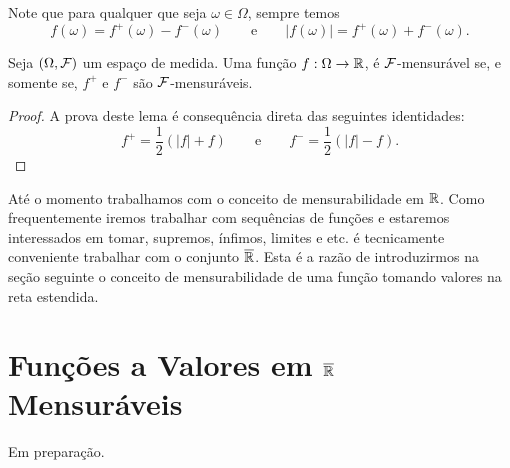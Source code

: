 Note que para qualquer que seja $\omega\in\Omega$, sempre temos
	\[
		f(\omega) = f^+(\omega)-f^{-}(\omega)
		\qquad
		\text{e}
		\qquad
		|f(\omega)| = f^+(\omega)+f^{-}(\omega).
	\]
	
	
\begin{lema}
	Seja $(\Omega,\mathcal{F})$ um espaço de medida. Uma função 
	$f:\Omega\to\mathbb{R}$, é $\mathcal{F}$-mensurável se, e somente se,
	$f^+$ e $f^-$ são $\mathcal{F}$-mensuráveis.
\end{lema}

\begin{proof}
A prova deste lema é consequência direta das seguintes identidades:
\[
	f^{+} = \frac{1}{2}(|f|+f)
	\qquad
	\text{e}
	\qquad
	f^{-} = \frac{1}{2}(|f|-f).
\]
\end{proof}


Até o momento trabalhamos com o conceito de mensurabilidade em 
$\mathbb{R}$. Como frequentemente iremos trabalhar com sequências de 
funções e estaremos interessados em tomar, supremos, ínfimos,
limites e etc. é tecnicamente conveniente trabalhar com o 
conjunto $\overline{\mathbb{R}}$. Esta é a razão de introduzirmos 
na seção seguinte o conceito de mensurabilidade de uma função 
tomando valores na reta estendida. 






\section{Funções a Valores em $\overline{\mathbb{R}}$ Mensuráveis}

\begin{center}
{\red Em preparação.}
\end{center}